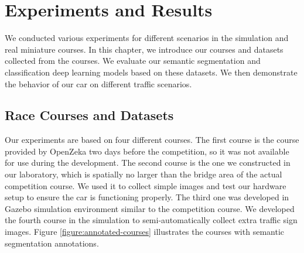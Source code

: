 \chapter{Experiments and Results}
\label{chp:b6}

We conducted various experiments for different scenarios in the simulation and
real miniature courses. In this chapter, we introduce our courses and datasets
collected from the courses. We evaluate our semantic segmentation and
classification deep learning models based on these datasets. We then
demonstrate the behavior of our car on different traffic scenarios.

\section{Race Courses and Datasets}

Our experiments are based on four different courses. The first course is the
course provided by OpenZeka  two days before the competition, so it was not
available for use during the development. The second course is the one we
constructed in our laboratory, which is spatially no larger than the bridge
area of the actual competition course. We used it to collect simple images and
test our hardware setup to ensure the car is functioning properly. The third
one was developed in Gazebo simulation environment similar to the competition
course. We developed the fourth course in the simulation to semi-automatically
collect extra traffic sign images. Figure \ref{figure:annotated-courses}
illustrates the courses with semantic segmentation annotations.

